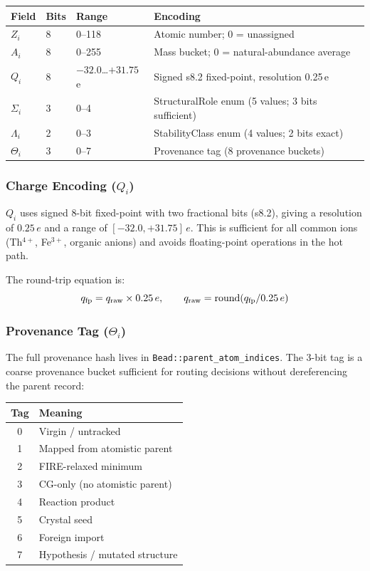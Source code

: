 \documentclass[11pt, a4paper, oneside]{article}
\theoremstyle{definition}
\begin{document}
\begin{center}
\begin{tabular}{llll}
\toprule
Field & Bits & Range & Encoding \\
\midrule
$Z_i$ & 8 & 0--118 & Atomic number; 0 = unassigned \\
$A_i$ & 8 & 0--255 & Mass bucket; 0 = natural-abundance average \\
$Q_i$ & 8 & $-32.0$\ldots$+31.75$\,e & Signed s8.2 fixed-point, resolution 0.25\,e \\
$\Sigma_i$ & 3 & 0--4 & StructuralRole enum (5 values; 3 bits sufficient) \\
$\Lambda_i$ & 2 & 0--3 & StabilityClass enum (4 values; 2 bits exact) \\
$\Theta_i$ & 3 & 0--7 & Provenance tag (8 provenance buckets) \\
\bottomrule
\end{tabular}
\end{center}

\subsubsection{Charge Encoding ($Q_i$)}

$Q_i$ uses signed 8-bit fixed-point with two fractional bits (s8.2),
giving a resolution of $0.25\,e$ and a range of $[-32.0, +31.75]\,e$.
This is sufficient for all common ions (Th$^{4+}$, Fe$^{3+}$,
organic anions) and avoids floating-point operations in the hot path.

The round-trip equation is:
%
\begin{equation}
  q_{\rm fp} = q_{\rm raw} \times 0.25\,e,
  \qquad
  q_{\rm raw} = \operatorname{round}(q_{\rm fp} / 0.25\,e)
  \label{eq:charge-roundtrip}
\end{equation}

\subsubsection{Provenance Tag ($\Theta_i$)}

The full provenance hash lives in \texttt{Bead::parent\_atom\_indices}.
The 3-bit tag is a coarse provenance bucket sufficient for routing
decisions without dereferencing the parent record:

\begin{center}
\begin{tabular}{cl}
\toprule
Tag & Meaning \\
\midrule
0 & Virgin / untracked \\
1 & Mapped from atomistic parent \\
2 & FIRE-relaxed minimum \\
3 & CG-only (no atomistic parent) \\
4 & Reaction product \\
5 & Crystal seed \\
6 & Foreign import \\
7 & Hypothesis / mutated structure \\
\bottomrule
\end{tabular}
\end{center}
\end{document}
